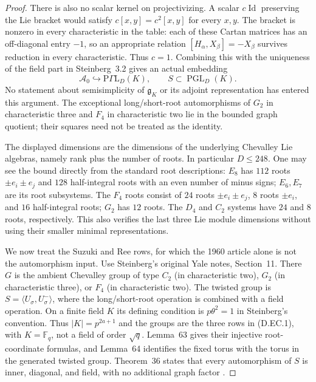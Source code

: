 \begin{proof}
There is also no scalar kernel on projectivizing.
A scalar $c\operatorname{Id}$ preserving the Lie bracket
would satisfy
$c[x,y]=c^2[x,y]$ for every $x,y$. The bracket is nonzero
in every characteristic in the table: each of these
Cartan matrices has an off-diagonal entry $-1$, so an
appropriate relation $[H_\alpha,X_\beta]=-X_\beta$
survives reduction in every characteristic. Thus $c=1$.
Combining this with the uniqueness of the field part in
Steinberg~3.2 gives an actual embedding
\[
 \mathcal A_0\hookrightarrow
       \mathrm{P}\Gamma\mathrm{L}_{D}(K),
 \qquad S\subset\operatorname{PGL}_{D}(K).                   \tag{D.EC.5}
\]
No statement about semisimplicity of $\mathfrak g_K$ or
its adjoint representation has entered this argument.
The exceptional long/short-root automorphisms of $G_2$
in characteristic three and $F_4$ in characteristic two
lie in the bounded graph quotient; their squares need
not be treated as the identity.

The displayed dimensions are the dimensions of the
underlying Chevalley Lie algebras, namely rank plus the
number of roots. In particular $D\leq248$. One may see
the bound directly from the standard root descriptions:
$E_8$ has $112$ roots $\pm e_i\pm e_j$ and $128$
half-integral roots with an even number of minus signs;
$E_6,E_7$ are its root subsystems. The $F_4$ roots consist
of $24$ roots $\pm e_i\pm e_j$, $8$ roots $\pm e_i$,
and $16$ half-integral roots; $G_2$ has $12$ roots.
The $D_4$ and $C_2$ systems have $24$ and $8$ roots,
respectively. This also verifies the last three Lie
module dimensions without using their smaller minimal
representations.

We now treat the Suzuki and Ree rows, for which the
1960 article alone is not the automorphism input.
Use Steinberg's original Yale notes, Section~11.
There $G$ is the ambient Chevalley group of type $C_2$
(in characteristic two), $G_2$ (in characteristic three),
or $F_4$ (in characteristic two). The twisted group is
$S=\langle U_\sigma,U^-_\sigma\rangle$, where the
long/short-root operation is combined with a field
operation. On a finite field $K$ its defining condition
is $p\theta^2=1$ in Steinberg's convention. Thus
$|K|=p^{2a+1}$ and the groups are the three rows in
(D.EC.1), with $K=\mathbb F_q$, not a field of order
$\sqrt q$. Lemma~63 gives their injective root-coordinate
formulas, and Lemma~64 identifies the fixed torus with
the torus in the generated twisted group. Theorem~36
states that every automorphism of $S$ is inner,
diagonal, and field, with no additional graph factor
\citep[Section~11, pp.~177--186 and Theorem~36 with its
complete written proof sketch on pp.~195--199]
{Steinberg1968YaleExceptionalB}.


\end{proof}
